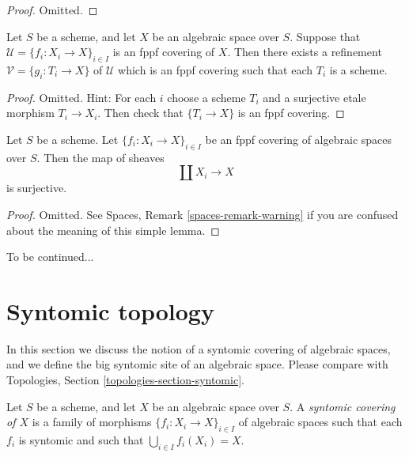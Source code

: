 \begin{proof}
Omitted.
\end{proof}

\begin{lemma}
\label{lemma-refine-fppf-schemes}
Let $S$ be a scheme, and let $X$ be an algebraic space over $S$.
Suppose that $\mathcal{U} = \{f_i : X_i \to X\}_{i \in I}$ is an
fppf covering of $X$. Then there exists a refinement 
$\mathcal{V} = \{g_i : T_i \to X\}$ of $\mathcal{U}$ which is an
fppf covering such that each $T_i$ is a scheme.
\end{lemma}

\begin{proof}
Omitted. Hint: For each $i$ choose a scheme $T_i$ and a surjective etale
morphism $T_i \to X_i$. Then check that $\{T_i \to X\}$ is an fppf covering.
\end{proof}

\begin{lemma}
\label{lemma-fppf-covering-surjective}
Let $S$ be a scheme.
Let $\{f_i : X_i \to X\}_{i \in I}$ be an fppf covering of algebraic
spaces over $S$. Then the map of sheaves
$$
\coprod X_i \longrightarrow X
$$
is surjective.
\end{lemma}

\begin{proof}
Omitted. See
Spaces, Remark \ref{spaces-remark-warning}
if you are confused about the meaning of this simple lemma.
\end{proof}

\noindent
To be continued...




\section{Syntomic topology}
\label{section-syntomic}

\noindent
In this section we discuss the notion of a syntomic covering of
algebraic spaces, and we define the big syntomic site of an
algebraic space. Please compare with
Topologies, Section \ref{topologies-section-syntomic}.

\begin{definition}
\label{definition-syntomic-covering}
Let $S$ be a scheme, and let $X$ be an algebraic space over $S$.
A {\it syntomic covering of $X$} is a family of morphisms
$\{f_i : X_i \to X\}_{i \in I}$ of algebraic spaces
such that each $f_i$ is syntomic
and such that $\bigcup_{i \in I} f_i(X_i) = X$.
\end{definition}

